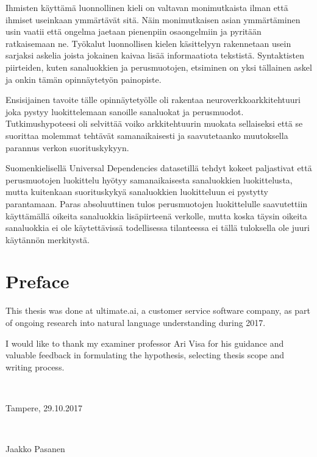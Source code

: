 \documentclass[12pt,a4paper,english
]{tutthesis}
\begin{document}
\begin{otherlanguage}{finnish}
Ihmisten käyttämä luonnollinen kieli on valtavan monimutkaista ilman että ihmiset useinkaan ymmärtävät sitä. Näin monimutkaisen asian ymmärtäminen usin vaatii että ongelma jaetaan pienenpiin osaongelmiin ja pyritään ratkaisemaan ne. Työkalut luonnollisen kielen käsittelyyn rakennetaan usein sarjaksi askelia joista jokainen kaivaa lisää informaatiota tekstistä. Syntaktisten piirteiden, kuten sanaluokkien ja perusmuotojen, etsiminen on yksi tällainen askel ja onkin tämän opinnäytetyön painopiste.

Ensisijainen tavoite tälle opinnäytetyölle oli rakentaa neuroverkkoarkkitehtuuri joka pystyy luokittelemaan sanoille sanaluokat ja perusmuodot. Tutkimushypoteesi oli selvittää voiko arkkitehtuurin muokata sellaiseksi että se suorittaa molemmat tehtävät samanaikaisesti ja saavutetaanko muutoksella parannus verkon suorituskykyyn.

Suomenkielisellä Universal Dependencies datasetillä tehdyt kokeet paljastivat että perusmuotojen luokittelu hyötyy samanaikaisesta sanaluokkien luokittelusta, mutta kuitenkaan suorituskykyä sanaluokkien luokitteluun ei pystytty parantamaan. Paras absoluuttinen tulos perusmuotojen luokittelulle saavutettiin käyttämällä oikeita sanaluokkia lisäpiirteenä verkolle, mutta koska täysin oikeita sanaluokkia ei ole käytettävissä todellisessa tilanteessa ei tällä tuloksella ole juuri käytännön merkitystä.



\end{otherlanguage} %


\chapter*{Preface}

This thesis was done at ultimate.ai, a customer service software company, as part of ongoing research into natural language understanding during 2017.

I would like to thank my examiner professor Ari Visa for his guidance and valuable feedback in formulating the hypothesis, selecting thesis scope and writing process.

~ 

Tampere, 29.10.2017

~

Jaakko Pasanen


\end{document}

